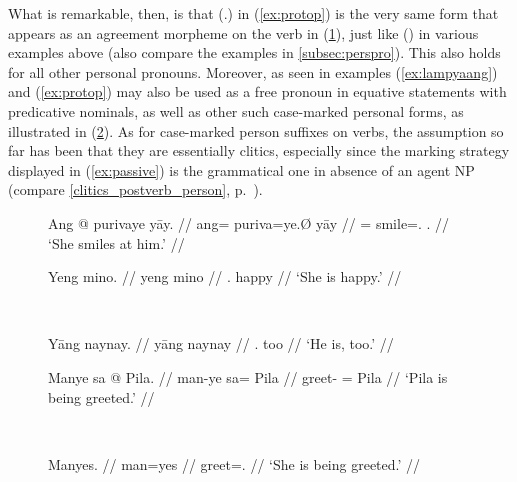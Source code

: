 \label{patagr}
What is remarkable, then, is that  (\TsgF{}.\Top{}) in
(\ref{ex:protop}) is the very same form that appears as an agreement morpheme
on the verb in (\ref{ex:ayrpronagr}), just like  (\TsgM{}) in
various examples above (also compare the examples in \autoref{subsec:perspro}).
This also holds for all other personal pronouns. Moreover, 
 as seen in examples (\ref{ex:lampyaang}) and 
(\ref{ex:protop}) may also be used as a free pronoun in equative statements
with predicative nominals, as well as other such case-marked personal forms, as
illustrated in (\ref{ex:indeppro}). As for case-marked person suffixes on
verbs, the assumption so far has been that they are essentially clitics,
especially since the marking strategy displayed in (\ref{ex:passive}) is the
grammatical one in absence of an agent NP (compare
\autoref{clitics_postverb_person}, p.~\pageref{clitics_postverb_person}).

\begin{figure}[h]
\ex\label{ex:ayrpronagr} %
\begingl
	\gla Ang @ purivaye yāy. //
	\glb ang= puriva=ye.Ø yāy //
	\glc \AgtT{}= smile=\TsgF{}.\Top{} \TsgM{}.\Loc{} //
	\glft `She smiles at him.' //
\endgl\xe
\end{figure}

\begin{figure}[h]
\ex{}\label{ex:indeppro} %
\begin{minipage}[t]{.5\remaining}
\tl\quad\begingl
	\gla Yeng mino. //
	\glb yeng mino //
	\glc \TsgF{}.\Aarg{} happy //
	\glft `She is happy.' //
\endgl
\end{minipage}
~
\begin{minipage}[t]{.5\remaining}
\tl\quad\begingl
	\gla Yāng naynay. //
	\glb yāng naynay //
	\glc \TsgM{}.\Aarg{} too //
	\glft `He is, too.' //
\endgl
\end{minipage}
\xe
\end{figure}

\begin{figure}[h]
\ex{}\label{ex:passive} %
\begin{minipage}[t]{.5\remaining}
\tl\quad\label{ex:manye}\begingl
	\gla Manye sa @ Pila. //
	\glb man-ye sa= ​Pila //
	\glc greet-\TsgF{} \Parg{}= ​Pila //
	\glft `Pila is being greeted.' //
\endgl
\end{minipage}
~
\begin{minipage}[t]{.5\remaining}
\tl\quad\label{ex:manyes}\begingl
	\gla Manyes. //
	\glb man=yes //
	\glc greet=\TsgF{}.\Parg{} //
	\glft `She is being greeted.' //
\endgl
\end{minipage}
\xe
\end{figure}

